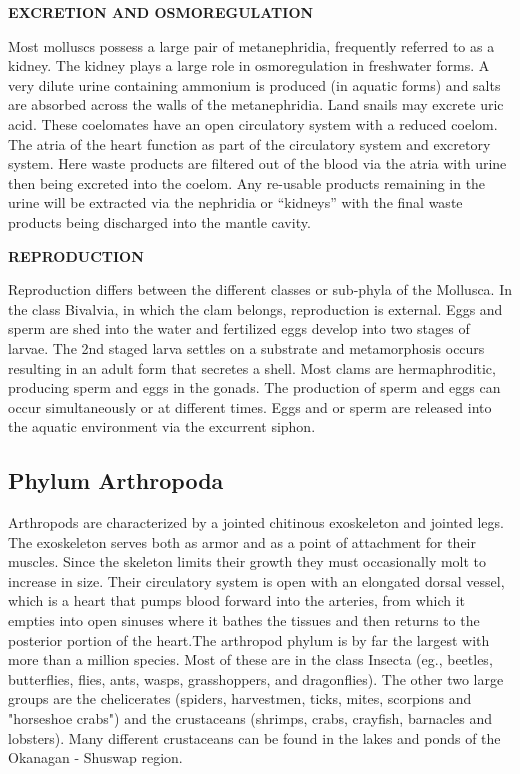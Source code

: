 \documentclass[
]{book}
\begin{document}
\textbf{EXCRETION AND OSMOREGULATION}

Most molluscs possess a large pair of metanephridia, frequently referred to as a kidney. The kidney plays a large role in osmoregulation in freshwater forms. A very dilute urine containing ammonium is produced (in aquatic forms) and salts are absorbed across the walls of the metanephridia. Land snails may excrete uric acid. These coelomates have an open circulatory system with a reduced coelom. The atria of the heart function as part of the circulatory system and excretory system. Here waste products are filtered out of the blood via the atria with urine then being excreted into the coelom. Any re-usable products remaining in the urine will be extracted via the nephridia or ``kidneys'' with the final waste products being discharged into the mantle cavity.

\textbf{REPRODUCTION}

Reproduction differs between the different classes or sub-phyla of the Mollusca. In the class Bivalvia, in which the clam belongs, reproduction is external. Eggs and sperm are shed into the water and fertilized eggs develop into two stages of larvae. The 2nd staged larva settles on a substrate and metamorphosis occurs resulting in an adult form that secretes a shell. Most clams are hermaphroditic, producing sperm and eggs in the gonads. The production of sperm and eggs can occur simultaneously or at different times. Eggs and or sperm are released into the aquatic environment via the excurrent siphon.

\hypertarget{phylum-arthropoda}{%
\subsection*{Phylum Arthropoda}\label{phylum-arthropoda}}

Arthropods are characterized by a jointed chitinous exoskeleton and jointed legs. The exoskeleton serves both as armor and as a point of attachment for their muscles. Since the skeleton limits their growth they must occasionally molt to increase in size. Their circulatory system is open with an elongated dorsal vessel, which is a heart that pumps blood forward into the arteries, from which it empties into open sinuses where it bathes the tissues and then returns
to the posterior portion of the heart.The arthropod phylum is by far the largest with more than a million species. Most of these are in the class Insecta (eg., beetles, butterflies, flies, ants, wasps, grasshoppers, and dragonflies). The other two large groups are the chelicerates (spiders, harvestmen, ticks, mites, scorpions and "horseshoe crabs") and the crustaceans (shrimps, crabs, crayfish, barnacles and lobsters). Many different crustaceans can be found in the lakes and ponds of the Okanagan - Shuswap region.
\end{document}

